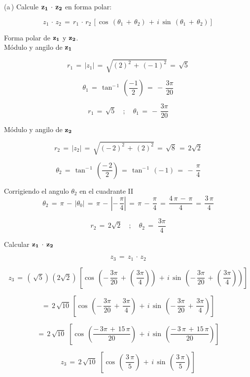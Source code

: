 \documentclass[a4paper,11pt,openany]{book}
\begin{document}
\textcolor{ao(english)}{(a\,)} Calcule $\bf{z_{1}\,\cdot\,z_{2}}$ en forma polar:

$$z_{1}\,\cdot\,z_{2}\,=\,r_{1}\,\cdot\,r_{2}\,\left[\cos\,(\theta_{1}\,+\,\theta_{2})\,+\,i\,\sin\,(\theta_{1}\,+\,\theta_{2})\right]$$

\textcolor{ao(english)}{} Forma polar de $\bf{z_{1}}$ y $\bf{z_{2}}$.\\

\textcolor{ao(english)}{} Módulo y angilo de $\bf{z_{1}}$ 

$$r_{1}\,=\,|z_{1}|\,=\,\sqrt{(2)^{2}\,+\,(-\,1)^{2}}\,=\,\sqrt{5}$$

$$\theta_{1}\,=\,\tan^{-\,1}\,\left(\dfrac{-1}{2}\right)\,=\,-\,\dfrac{3\pi}{20}$$

$$\boxed{r_{1}\,=\,\sqrt{5} \quad;\quad \theta_{1}\,=\,-\,\dfrac{3\pi}{20}}$$

\textcolor{ao(english)}{} Módulo y angilo de $\bf{z_{2}}$ 

$$r_{2}\,=\,|z_{2}|\,=\,\sqrt{(-\,2)^{2}\,+\,(2)^{2}}\,=\,\sqrt{8}\,=\,2\sqrt{2}$$

$$\theta_{2}\,=\,\tan^{-\,1}\,\left(\dfrac{-\,2}{2}\right)\,=\,\tan^{-\,1}\,(-\,1)\,=\,-\,\dfrac{\pi}{4}$$

\textcolor{ao(english)}{} Corrigiendo el angulo $\theta_{2}$ en el cuadrante II
$$\theta_{2}\,=\,\pi\,-\,|\theta_{0}|\,=\,\pi\,-\,\left|-\,\dfrac{\pi}{4}\right|\,=\,\pi\,-\,\dfrac{\pi}{4}\,=\,\dfrac{4\,\pi\,-\,\pi}{4}\,=\,\dfrac{3\,\pi}{4}$$

$$\boxed{r_{2}\,=\,2\sqrt{2} \quad;\quad \theta_{2}\,=\,\,\dfrac{3\pi}{4}}$$

\textcolor{ao(english)}{} Calcular $\bf{z_{1}\,\cdot\,z_{2}}$

$$z_{3}\,=\,z_{1}\,\cdot\,z_{2}$$

$$z_{3}\,=\,\left(\,\sqrt{5}\right)\,(2\sqrt{2})\,\left[\cos\,\left(-\,\dfrac{3\pi}{20}\,+\,\left(\,\dfrac{3\pi}{4}\right)\right)\,+\,i\,\sin\,\left(-\,\dfrac{3\pi}{20}\,+\,\left(\,\dfrac{3\pi}{4}\right)\right)\right]$$

$$=\,2\,\sqrt{10}\,\left[\cos\,\left(-\,\dfrac{3\pi}{20}\,+\,\dfrac{3\pi}{4}\right)\,+\,i\,\sin\,\left(-\,\dfrac{3\pi}{20}\,+\,\dfrac{3\pi}{4}\right)\right]$$

$$=\,2\,\sqrt{10}\,\,\left[\cos\,\left(\dfrac{-\,3\pi\,+\,15\,\pi}{20}\right)\,+\,i\,\sin\,\left(\dfrac{-\,3\,\pi\,+\,15\,\pi}{20}\right)\right]$$

$$z_{3}\,=\,2\,\sqrt{10}\,\,\left[\cos\,\left(\,\dfrac{3\,\pi}{5}\right)\,+\,i\,\sin\,\left(\,\dfrac{3\,\pi}{5}\right)\right]$$
\end{document}
